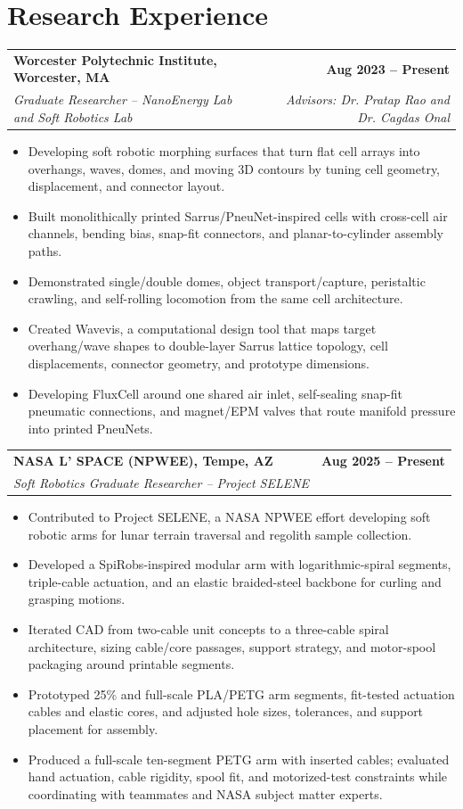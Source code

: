 \documentclass[10pt,letterpaper]{article}
\makeatletter
\newcommand{\roleentry}[4]{%
  \begin{tabularx}{\textwidth}{@{}>{\raggedright\arraybackslash}X r@{}}
    \textbf{#1} & \textbf{#2}\\
    \textit{\textcolor{muted}{#3}} & \textit{\textcolor{muted}{#4}}
  \end{tabularx}
  \vspace{-2pt}
}
\makeatother
\begin{document}
\section*{Research Experience}
\roleentry{Worcester Polytechnic Institute, Worcester, MA}{Aug 2023 -- Present}{Graduate Researcher -- NanoEnergy Lab and Soft Robotics Lab}{Advisors: Dr. Pratap Rao and Dr. Cagdas Onal}
\begin{itemize}
  \item Developing soft robotic morphing surfaces that turn flat cell arrays into overhangs, waves, domes, and moving 3D contours by tuning cell geometry, displacement, and connector layout.
  \item Built monolithically printed Sarrus/PneuNet-inspired cells with cross-cell air channels, bending bias, snap-fit connectors, and planar-to-cylinder assembly paths.
  \item Demonstrated single/double domes, object transport/capture, peristaltic crawling, and self-rolling locomotion from the same cell architecture.
  \item Created Wavevis, a computational design tool that maps target overhang/wave shapes to double-layer Sarrus lattice topology, cell displacements, connector geometry, and prototype dimensions.
  \item Developing FluxCell around one shared air inlet, self-sealing snap-fit pneumatic connections, and magnet/EPM valves that route manifold pressure into printed PneuNets.
\end{itemize}

\roleentry{NASA L' SPACE (NPWEE), Tempe, AZ}{Aug 2025 -- Present}{Soft Robotics Graduate Researcher -- Project SELENE}{}
\begin{itemize}
  \item Contributed to Project SELENE, a NASA NPWEE effort developing soft robotic arms for lunar terrain traversal and regolith sample collection.
  \item Developed a SpiRobs-inspired modular arm with logarithmic-spiral segments, triple-cable actuation, and an elastic braided-steel backbone for curling and grasping motions.
  \item Iterated CAD from two-cable unit concepts to a three-cable spiral architecture, sizing cable/core passages, support strategy, and motor-spool packaging around printable segments.
  \item Prototyped 25\% and full-scale PLA/PETG arm segments, fit-tested actuation cables and elastic cores, and adjusted hole sizes, tolerances, and support placement for assembly.
  \item Produced a full-scale ten-segment PETG arm with inserted cables; evaluated hand actuation, cable rigidity, spool fit, and motorized-test constraints while coordinating with teammates and NASA subject matter experts.
\end{itemize}
\end{document}
